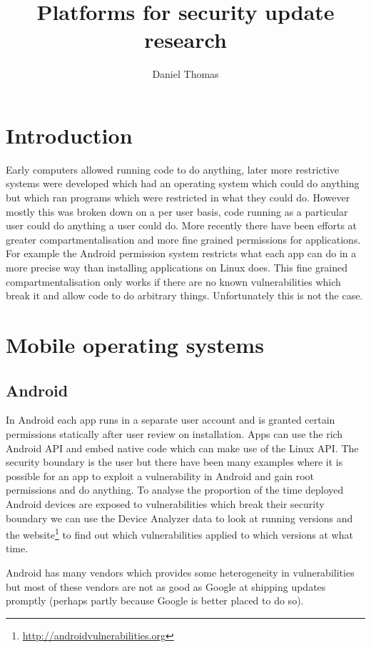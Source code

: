 \documentclass[12pt,a4paper]{article}
\author{Daniel Thomas}
\title{Platforms for security update research}
\begin{document}
\maketitle

\section{Introduction}
Early computers allowed running code to do anything, later more restrictive systems were developed which had an operating system which could do anything but which ran programs which were restricted in what they could do.
However mostly this was broken down on a per user basis, code running as a particular user could do anything a user could do.
More recently there have been efforts at greater compartmentalisation and more fine grained permissions for applications.
For example the Android permission system restricts what each app can do in a more precise way than installing applications on Linux does.
This fine grained compartmentalisation only works if there are no known vulnerabilities which break it and allow code to do arbitrary things.
Unfortunately this is not the case.

\section{Mobile operating systems}


\subsection{Android}
In Android each app runs in a separate user account and is granted certain permissions statically after user review on installation.
Apps can use the rich Android API and embed native code which can make use of the Linux API.
The security boundary is the user but there have been many examples where it is possible for an app to exploit a vulnerability in Android and gain root permissions and do anything.
To analyse the proportion of the time deployed Android devices are exposed to vulnerabilities which break their security boundary we can use the Device Analyzer data to look at running versions and the website\footnote{\url{http://androidvulnerabilities.org}} to find out which vulnerabilities applied to which versions at what time.

Android has many vendors which provides some heterogeneity in vulnerabilities but most of these vendors are not as good as Google at shipping updates promptly (perhaps partly because Google is better placed to do so).
\end{document}
